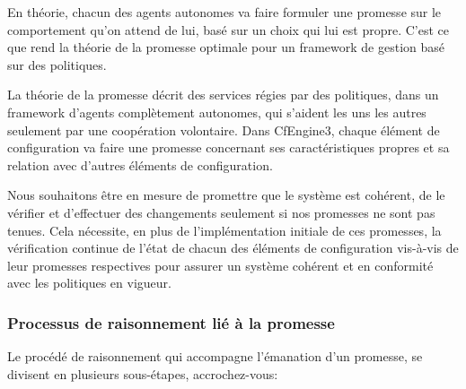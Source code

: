 En théorie, chacun des agents autonomes va faire formuler une promesse sur le
comportement qu'on attend de lui, basé sur un choix qui lui est propre. C'est ce
que rend la théorie de la promesse optimale pour un framework de gestion basé
sur des politiques.

La théorie de la promesse décrit des services régies par des politiques, dans un
framework d'agents complètement autonomes, qui s'aident les uns les autres
seulement par une coopération volontaire. Dans CfEngine3, chaque élément de
configuration va faire une promesse concernant ses caractéristiques propres et
sa relation avec d'autres éléments de configuration.

Nous souhaitons être en mesure de promettre que le système est cohérent, de le
vérifier et d'effectuer des changements seulement si nos promesses ne sont pas
tenues. Cela nécessite, en plus de l'implémentation initiale de ces promesses,
la vérification continue de l'état de chacun des éléments de configuration
vis-à-vis de leur promesses respectives pour assurer un système cohérent et en
conformité avec les politiques en vigueur.


\subsubsection{Processus de raisonnement lié à la promesse}

Le procédé de raisonnement qui accompagne l'émanation d'un promesse, se divisent
en plusieurs sous-étapes, accrochez-vous:

